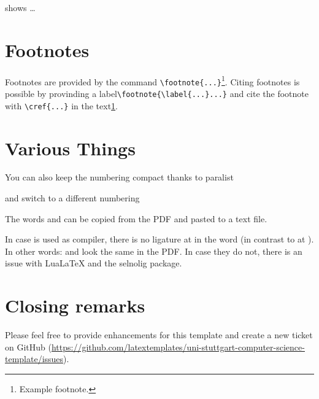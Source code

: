  shows \ldots

\section{Footnotes}
Footnotes are provided by the command \verb+\footnote{...}+\footnote{\label{fussnote}Example footnote.}. Citing footnotes is possible by provinding a label\verb+\footnote{\label{...}...}+ and cite the footnote with \verb+\cref{...}+ in the text\cref{fussnote}.

\section{Various Things}
\label{sec:diff}

\begin{filecontents*}{\democodefile}
\begin{compactenum}[I.]
  \item You can also keep the numbering compact thanks to paralist
  \item and switch to a different numbering
\end{compactenum}
\end{filecontents*}

The words  and  can be copied from the PDF and pasted to a text file.

\begin{filecontents*}{\democodefile}
In case \LuaLaTeX{} is used as compiler, there is no ligature at  in the word  (in contrast to  at ).
In other words:  and  look the same in the PDF.
In case they do not, there is an issue with Lua\LaTeX{} and the selnolig package.
\end{filecontents*}


\section{Closing remarks}
Please feel free to provide enhancements for this template and create a new ticket on GitHub (\url{https://github.com/latextemplates/uni-stuttgart-computer-science-template/issues}).

